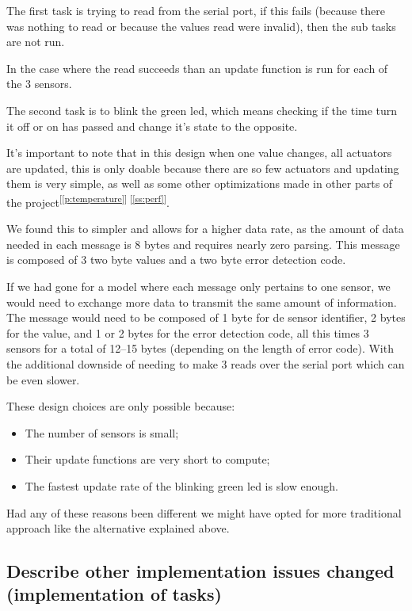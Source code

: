 \documentclass[10pt]{article}
\begin{document}
The first task is trying to read from the serial port, if this fails (because
there was nothing to read or because the values read were invalid), then the sub
tasks are not run.

In the case where the read succeeds than an update function is run for each of
the 3 sensors.

The second task is to blink the green led, which means checking if the time turn
it off or on has passed and change it's state to the opposite.

It's important to note that in this design when one value changes, all actuators
are updated, this is only doable because there are so few actuators and updating
them is very simple, as well as some other optimizations made in other parts of
the project\textsuperscript{[\ref{p:temperature}] [\ref{ss:perf}]}.

We found this to simpler and allows for a higher data rate, as the amount of
data needed in each message is 8 bytes and requires nearly zero parsing. This
message is composed of 3 two byte values and a two byte error detection code.

If we had gone for a model where each message only pertains to one sensor, we
would need to exchange more data to transmit the same amount of information.
The message would need to be composed of 1 byte for de sensor identifier, 2 bytes
for the value, and 1 or 2 bytes for the error detection code, all this times 3
sensors for a total of 12--15 bytes (depending on the length of error code).
With the additional downside of needing to make 3 reads over the serial port
which can be even slower.

These design choices are only possible because:

\begin{itemize}
    \item The number of sensors is small;
    \item Their update functions are very short to compute;
    \item The fastest update rate of the blinking green led is slow enough.
\end{itemize}

Had any of these reasons been different we might have opted for more traditional
approach like the alternative explained above.

\subsection{Describe other implementation issues changed (implementation of
tasks)}
\end{document}
